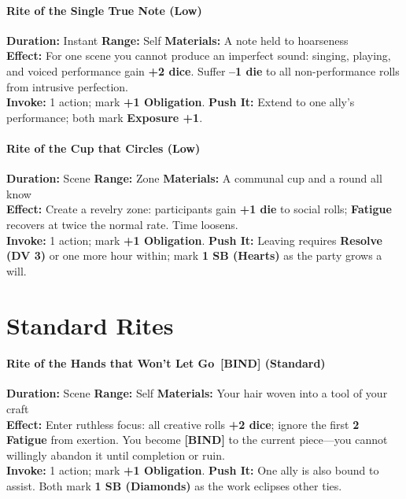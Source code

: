 \paragraph{\textbf{Rite of the Single True Note (Low)}} 
\textbf{Duration:} Instant \quad \textbf{Range:} Self \quad \textbf{Materials:} A note held to hoarseness \\
\textbf{Effect:} For one scene you cannot produce an imperfect sound: singing, playing, and voiced performance gain \textbf{+2 dice}. Suffer \textbf{--1 die} to all non-performance rolls from intrusive perfection. \\
\textbf{Invoke:} 1 action; mark \textbf{+1 Obligation}. \quad \textbf{Push It:} Extend to one ally's performance; both mark \textbf{Exposure +1}.

\paragraph{\textbf{Rite of the Cup that Circles (Low)}} 
\textbf{Duration:} Scene \quad \textbf{Range:} Zone \quad \textbf{Materials:} A communal cup and a round all know \\
\textbf{Effect:} Create a revelry zone: participants gain \textbf{+1 die} to social rolls; \textbf{Fatigue} recovers at twice the normal rate. Time loosens. \\
\textbf{Invoke:} 1 action; mark \textbf{+1 Obligation}. \quad \textbf{Push It:} Leaving requires \textbf{Resolve (DV 3)} or one more hour within; mark \textbf{1 SB (Hearts)} as the party grows a will.

\section*{Standard Rites}
\label{sec:palinode-standard}

\paragraph{\textbf{Rite of the Hands that Won't Let Go \,[BIND] (Standard)}} 
\textbf{Duration:} Scene \quad \textbf{Range:} Self \quad \textbf{Materials:} Your hair woven into a tool of your craft \\
\textbf{Effect:} Enter ruthless focus: all creative rolls \textbf{+2 dice}; ignore the first \textbf{2 Fatigue} from exertion. You become \textbf{[BIND]} to the current piece---you cannot willingly abandon it until completion or ruin. \\
\textbf{Invoke:} 1 action; mark \textbf{+1 Obligation}. \quad \textbf{Push It:} One ally is also bound to assist. Both mark \textbf{1 SB (Diamonds)} as the work eclipses other ties.

